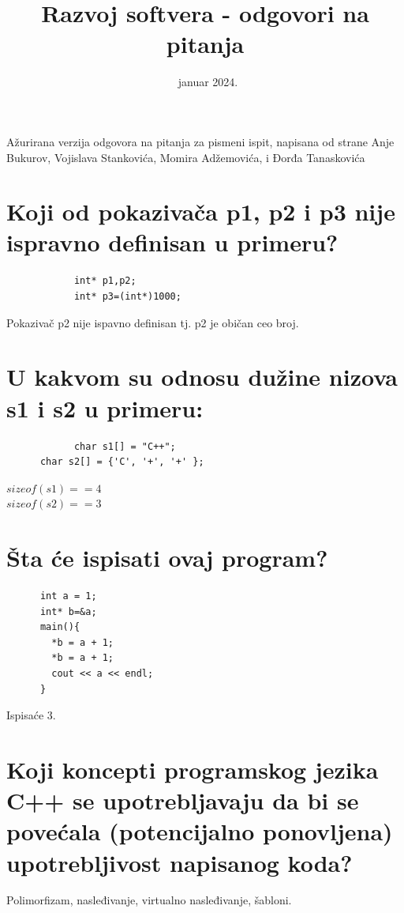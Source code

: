 \documentclass[a4paper]{article}
\begin{document}
\title{Razvoj softvera - odgovori na pitanja}

\date{~januar 2024.}

\maketitle

\abstract

Ažurirana verzija odgovora na pitanja za pismeni ispit, 
napisana od strane Anje Bukurov, Vojislava Stankovića,
Momira Adžemovića, i Đorđa Tanaskovića

\tableofcontents

\section{Koji od pokazivača p1, p2 i p3 nije ispravno definisan u primeru?}
		 \begin{lstlisting}
			int* p1,p2;
			int* p3=(int*)1000;\end{lstlisting}
		Pokazivač p2 nije ispavno definisan tj. p2 je običan ceo broj.

\section{U kakvom su odnosu dužine nizova s1 i s2 u primeru:}
		\begin{lstlisting}
			char s1[] = "C++";
      char s2[] = {'C', '+', '+' };\end{lstlisting}
      $sizeof(s1) == 4$\\
      $sizeof(s2) == 3$
    
\section{Šta će ispisati ovaj program?}
    \begin{lstlisting}
      int a = 1;
      int* b=&a;
      main(){
        *b = a + 1;
        *b = a + 1;
        cout << a << endl;
      }\end{lstlisting}

    Ispisaće 3.

\section{Koji koncepti programskog jezika C++ se upotrebljavaju da bi se 
         povećala (potencijalno ponovljena) upotrebljivost napisanog koda?}
    Polimorfizam, nasleđivanje, virtualno nasleđivanje, šabloni.
\end{document}
